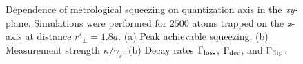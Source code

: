 \documentclass[preprint,aps,pra,onecolumn]{revtex4-1} %
\begin{document}
\begin{figure}
\begin{minipage}{.49\linewidth}
\centering
{}
\end{minipage}
\begin{minipage}{.49\linewidth}
\centering
{}
\end{minipage}
\caption{Dependence of metrological squeezing on quantization axis in the \emph{xy}-plane. Simulations were performed for $2500$ atoms trapped on the \emph{x}-axis at distance $ r'\!_\perp=1.8a$. (a) Peak achievable squeezing. (b) Measurement strength $\kappa/\gamma_s$.  (b) Decay rates $\Gamma_{\rm loss}$, $\Gamma_{\rm dec}$, and $\Gamma_{\rm flip}$. }\label{Fig::Squeezing_QuantizationAxis}
\end{figure}
\end{document}

